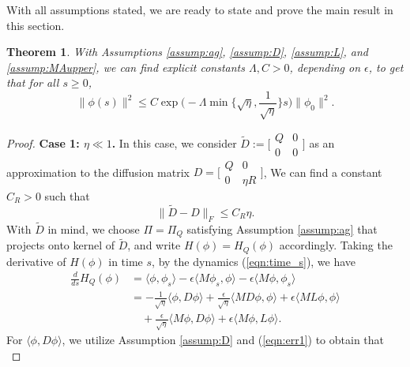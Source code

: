 \documentclass[11pt]{article}
\newtheorem{thm}{Theorem}[section]
\newcommand{\1}{\mathds{1}}
\begin{document}
With all assumptions stated, we are ready to state and prove the main result in this section. 
\begin{thm}\label{thm:hypocoercivity}
With Assumptions \ref{assump:ag}, \ref{assump:D}, \ref{assump:L}, and \ref{assump:MAupper}, we can find explicit constants $\Lambda, C>0$, depending on $\epsilon$,  to get that for all $s \geq 0$,
\begin{equation}
    \|\phi(s)\|^2 \leq C \exp\Big(-\Lambda \min\Big\{\sqrt{\eta}, \frac{1}{\sqrt{\eta}}\Big\} s \Big)\|\phi_0\|^2.
\end{equation}
\end{thm}
\begin{proof}
\textbf{Case 1: $\eta\ll 1$.} In this case, we consider 
$\tilde D  := \bigl[\begin{smallmatrix}
            Q & 0\\
            0 & 0
        \end{smallmatrix}\bigr]$
as an approximation to the diffusion matrix $D= \bigl[\begin{smallmatrix}
            Q & 0\\
            0 & \eta R
        \end{smallmatrix}\bigr]$,
       We can find a constant $C_R>0$ such that
        \begin{equation}\label{eqn:err1}
            \|\tilde D- D\|_F\leq C_R \eta.
        \end{equation}
With $\tilde D$ in mind, we choose $\Pi = \Pi_Q$ satisfying Assumption \ref{assump:ag} that projects onto kernel of  $\tilde D$, and write $H(\phi) = H_Q(\phi)$ accordingly. Taking the derivative of $H(\phi)$ in time $s$, by the dynamics (\ref{eqn:time_s}), we have
\begin{equation}
    \begin{aligned}
        \frac{d}{ds} H_Q(\phi) &= \langle \phi, \phi_s\rangle-\epsilon\langle M\phi_s, \phi\rangle-\epsilon\langle M\phi, \phi_s\rangle\\
        &= -\frac{1}{\sqrt{\eta}}\langle \phi, D\phi\rangle + \frac{\epsilon}{\sqrt{\eta}}\langle MD\phi, \phi\rangle+\epsilon\langle M L\phi, \phi\rangle\\
        &\quad +\frac{\epsilon}{\sqrt{\eta}}\langle M\phi, D\phi\rangle+\epsilon\langle M\phi, L \phi\rangle.
    \end{aligned}
\end{equation}
For $\langle \phi, D\phi\rangle$, we utilize Assumption \ref{assump:D} and (\ref{eqn:err1}) to obtain that
\begin{equation}

\end{equation}
\end{proof}
\end{document}
